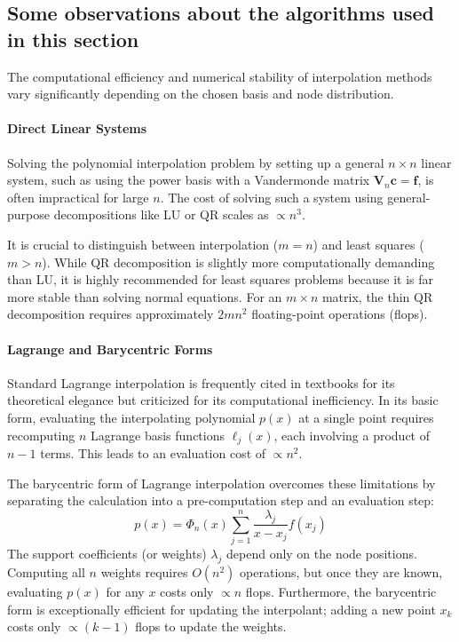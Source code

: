 \subsection{Some observations about the algorithms used in this section}

The computational efficiency and numerical stability of interpolation methods
vary significantly depending on the chosen basis and node distribution.

\paragraph{Direct Linear Systems}
Solving the polynomial interpolation problem by setting up a general $n \times
	n$ linear system, such as using the power basis with a Vandermonde
	matrix $\mathbf{V}_n \mathbf{c} = \mathbf{f}$, is often impractical for large
$n$. The cost of solving such a system using general-purpose decompositions like
LU or QR scales as $\propto n^3$.

It is crucial to distinguish between interpolation ($m=n$) and
least squares ($m > n$). While QR decomposition is slightly more
computationally demanding than LU, it is highly recommended for least squares
problems because it is far more stable than solving normal equations. For an $m
	\times n$ matrix, the thin QR decomposition requires approximately $2mn^2$
floating-point operations (flops).

\paragraph{Lagrange and Barycentric Forms}
Standard Lagrange interpolation is frequently cited in textbooks for its
theoretical elegance but criticized for its computational inefficiency. In its
basic form, evaluating the interpolating polynomial $p(x)$ at a single point
requires recomputing $n$ Lagrange basis functions $\ell_j(x)$, each involving a
product of $n-1$ terms. This leads to an evaluation cost of $\propto n^2$.

The barycentric form of Lagrange interpolation overcomes these
limitations by separating the calculation into a pre-computation step and an
evaluation step:
\begin{equation*}
	p(x) = \Phi_{n}(x) \sum_{j=1}^{n} \frac{\lambda_{j}}{x - x_{j}}f(x_{j})
\end{equation*}
The support coefficients (or weights) $\lambda_j$ depend only on the node
positions. Computing all $n$ weights requires $O(n^2)$ operations, but once they
are known, evaluating $p(x)$ for any $x$ costs only $\propto n$ flops.
Furthermore, the barycentric form is exceptionally efficient for
updating the interpolant; adding a new point $x_{k}$ costs only
$\propto (k-1)$ flops to update the weights.

